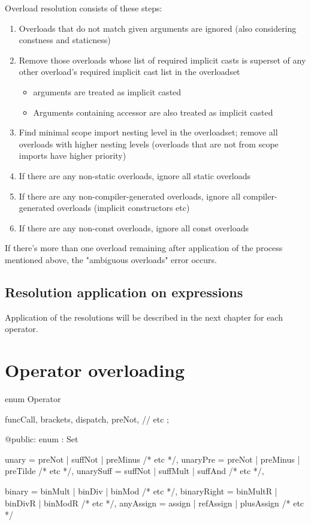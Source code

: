 Overload resolution consists of these steps:
\begin{enumerate}
	\item Overloads that do not match given arguments are ignored (also considering constness and staticness)
	\item Remove those overloads whose list of required implicit casts is superset of any other overload's required implicit cast list in the overloadset
	\begin{itemize}
		\item {} arguments are treated as implicit casted
		\item Arguments containing  accessor are also treated as implicit casted
	\end{itemize}
	\item Find minimal scope import nesting level in the overloadset; remove all overloads with higher nesting levels (overloads that are not from scope imports have higher priority)
	\item If there are any non-static overloads, ignore all static overloads
	\item If there are any non-compiler-generated overloads, ignore all compiler-generated overloads (implicit constructors etc)
	\item If there are any non-const overloads, ignore all const overloads
\end{enumerate}

If there's more than one overload remaining after application of the process mentioned above, the "ambiguous overloads" error occurs.

\subsection{Resolution application on expressions}
Application of the resolutions will be described in the next chapter for each operator.

\section{Operator overloading}
\begin{code}
enum Operator {
	funcCall,
	brackets,
	dispatch,
	preNot,
	// etc
	;
	
@public:
	enum : Set {
		unary = preNot | suffNot | preMinus /* etc */,
		unaryPre = preNot | preMinus | preTilde /* etc */,
		unarySuff = suffNot | suffMult | suffAnd /* etc */,
		
		binary = binMult | binDiv | binMod /* etc */,
		binaryRight = binMultR | binDivR | binModR /* etc */,
		anyAssign = assign | refAssign | plusAssign /* etc */
	}	
}
\end{code}

